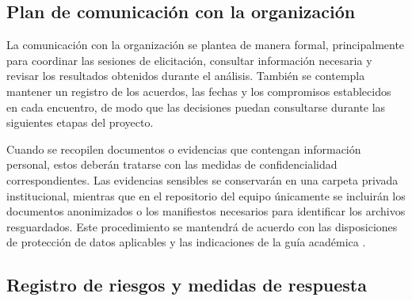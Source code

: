 \documentclass[11pt,a4paper]{article}
\begin{document}
\subsection{Plan de comunicación con la organización}

La comunicación con la organización se plantea de manera formal, principalmente para coordinar las sesiones de elicitación, consultar información necesaria y revisar los resultados obtenidos durante el análisis. También se contempla mantener un registro de los acuerdos, las fechas y los compromisos establecidos en cada encuentro, de modo que las decisiones puedan consultarse durante las siguientes etapas del proyecto.

Cuando se recopilen documentos o evidencias que contengan información personal, estos deberán tratarse con las medidas de confidencialidad correspondientes. Las evidencias sensibles se conservarán en una carpeta privada institucional, mientras que en el repositorio del equipo únicamente se incluirán los documentos anonimizados o los manifiestos necesarios para identificar los archivos resguardados. Este procedimiento se mantendrá de acuerdo con las disposiciones de protección de datos aplicables y las indicaciones de la guía académica \cite{pohl2015requirements,silabo_isr401}.

\subsection{Registro de riesgos y medidas de respuesta}

\end{document}
